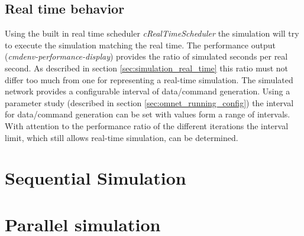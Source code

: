 \subsection{Real time behavior}
\label{sec:measurements_methods_realtime}
Using the built in real time scheduler \emph{cRealTimeScheduler} the simulation will try to execute the simulation matching the real time.
The performance output (\emph{cmdenv-performance-display}) provides the ratio of simulated seconds per real second.
As described in section \ref{sec:simulation_real_time} this ratio must not differ too much from one for representing a real-time simulation.
The simulated network provides a configurable interval of data/command generation.
Using a parameter study (described in section \ref{sec:omnet_running_config}) the interval for data/command generation can be set with values form a range of intervals.
With attention to the performance ratio of the different iterations the interval limit, which still allows real-time simulation, can be determined.

\section{Sequential Simulation}
\label{sec:measurements_sequential}

\section{Parallel simulation}
\label{sec:measurements_parallel}